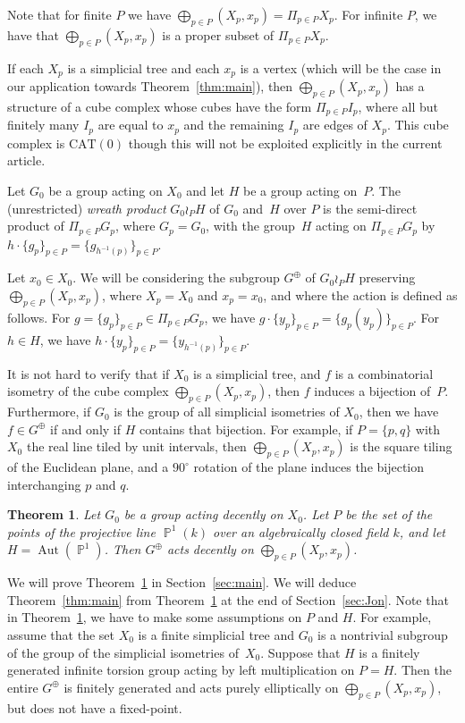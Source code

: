\documentclass[JEP,XML,SOM,Unicode, NoEqCountersInSection,published]{cedram}
\newcommand{\CAT}{\mathrm{CAT}}
\newcommand{\p}{\operatorname{\mathbb{P}}}\let\P\p
\newcommand{\Aut}{\operatorname{Aut}}
\theoremstyle{plain}
\newtheorem{theorem}{Theorem}[section]
\theoremstyle{definition}
\begin{document}
Note that for finite $P$ we have $\bigoplus_{p\in P} (X_p,x_p)=\Pi_{p\in P} X_p$. For infinite $P$, we have that
$\bigoplus_{p\in P} (X_p,x_p)$ is a proper subset of $\Pi_{p\in P} X_p$.

If each $X_p$ is a simplicial tree and each $x_p$ is a vertex (which will be the case in our application towards Theorem~\ref{thm:main}), then $\bigoplus_{p\in P} (X_p,x_p)$ has a structure of a cube complex {whose cubes have the form $\Pi_{p\in P} I_p$, where all but finitely many $I_p$ are equal to $x_p$ and the remaining $I_p$ are edges of $X_p$}. This cube complex is $\CAT(0)$ though this will not be exploited explicitly in the current article.

Let $G_0$ be a group acting on $X_0$ and let $H$ be a group acting on~$P$. The (unrestricted) \emph{wreath product} $G_0\wr_P H$ of $G_0$ and~$H$ over $P$ is the semi-direct product of $\Pi_{p\in P} G_p$, where $G_p=G_0$, with the group~$H$ acting on $\Pi_{p\in P} G_p$ by $h\cdot \{g_p\}_{p\in P}=\{g_{h^{-1}(p)}\}_{p\in P}$.

Let $x_0\in X_0$. We will be considering the subgroup $G^\oplus$ of $G_0\wr_P H$ preserving $\bigoplus_{p\in P} (X_p,x_p)$, where $X_p=X_0$ and $x_p=x_0$, and where the action is defined as follows. For $g=\{g_p\}_{p\in P}\in \Pi_{p\in P}G_p$, we have $g \cdot \{y_p\}_{p\in P}=\{g_p(y_p)\}_{p\in P}$. For $h\in H$, we have $h\cdot \{y_p\}_{p\in P}=\{y_{h^{-1}(p)}\}_{p\in P}$.

It is not hard to verify that if $X_0$ is a simplicial tree, and $f$ is a combinatorial isometry of the cube complex $\bigoplus_{p\in P} (X_p,x_p)$, then $f$ induces a bijection of~$P$. Furthermore, if $G_0$ is the group of all simplicial isometries of $X_0$, then we have $f\in G^\oplus$ if and only if $H$ contains that bijection. For example, if $P=\{p,q\}$ with $X_0$ the real line tiled by unit intervals, then $\bigoplus_{p\in P} (X_p,x_p)$ is the square tiling of the Euclidean plane, and a $90^\circ$ rotation of the plane induces the bijection interchanging $p$ and $q$.

\begin{theorem}
\label{thm:maing}
Let $G_0$ be a group acting decently on $X_0$. Let $P$ be the set of {the points of the projective line $\p^1(k)$} over an algebraically closed field $k$, and let $H=\Aut(\p^1)$. Then $G^\oplus$ acts decently on $\bigoplus_{p\in P} (X_p,x_p)$. \end{theorem}

We will prove Theorem~\ref{thm:maing} in Section~\ref{sec:main}. {We will deduce Theorem~\ref{thm:main} from Theorem~\ref{thm:maing} at the end of Section~\ref{sec:Jon}}.
Note that in Theorem~\ref{thm:maing}, we have to make some assumptions on $P$ and $H$. For example, assume that the set $X_0$ is {a finite simplicial tree and $G_0$ is a nontrivial subgroup of the group of the simplicial isometries of~$X_0$}. Suppose that $H$ is a finitely generated infinite torsion group acting by left multiplication on $P=H$. Then the entire $G^\oplus$ is finitely generated and acts purely elliptically on $\bigoplus_{p\in P} (X_p,x_p)$, but does not have a fixed-point.
\end{document}
